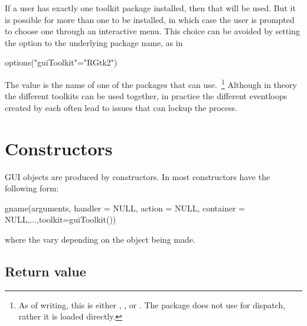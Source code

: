 If a user has exactly one toolkit package installed, then that will be
used. But it is possible for more than one to be installed, in which
case the user is prompted to choose one through an interactive menu. This
choice can be avoided by setting the option  to the
underlying \R\/ package name, as in
\begin{Schunk}
\begin{Sinput}
 options("guiToolkit"="RGtk2")
\end{Sinput}
\end{Schunk}
The value is the name of one of the \R\/ packages that  can
use.~\footnote{As of writing, this is either , , or
. The  package does not use 
for dispatch, rather it is loaded directly.}
Although in theory the different toolkits can be used together, in
practice the different eventloops created by each often lead to issues
that can lockup the \R\/ process.





\section{Constructors}
\label{sec:constructors}
GUI objects are produced by constructors. In
 most constructors have the following form: 
\begin{Schunk}
\begin{Sinput}
 gname(arguments, handler = NULL, action = NULL, 
       container = NULL,...,toolkit=guiToolkit())
\end{Sinput}
\end{Schunk}
where the  vary depending on the object being made. 

\subsection{Return value}

